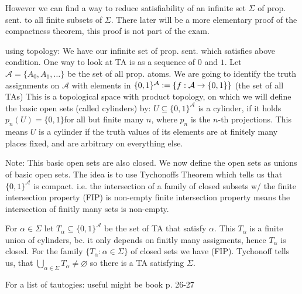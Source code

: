 However we can find a way to reduce satisfiability of an infinite set $\Sigma$ of prop. sent. to all finite subsets of $\Sigma$.
There later will be a more elementary proof of the compactness theorem, this proof is not part of the exam.
{
    using topology: We have our infinite set of prop. sent. which satisfies above condition. One way to look at TA is as a sequence of $0$ and $1$.
    Let $\mathcal{A} = \{A_0, A_1,\dots\}$ be the set of all prop. atoms. We are going to identify the truth assignments on $\mathcal{A}$
    with elements in $\{0,1\}^\mathcal{A}\vcentcolon= \{f: \mathcal{A}\to \{0,1\}\}$ (the set of all TAs)
    This is a topological space with product topology, on which we will define
    the basic open sets (called cylinders) by:
    $ U\subseteq \{0,1\}^\mathcal{A}$ is a cylinder, if it holds $p_n(U) = \{0,1\}$for all but finite many $n$, where $p_n$ is the $n$-th projections.
    This means $U$ is a cylinder if the truth values of its elements are at finitely many places fixed, and are arbitrary on everything else.
    
    
    Note: This basic open sets are also closed.
    We now define the open sets as unions of basic open sets.
    The idea is to use Tychonoffs Theorem which tells us that $\{0,1\}^\mathcal{A}$ is compact. i.e.
    the intersection of a family of closed subsets w/ the finite intersection property (FIP) is non-empty
    finite intersection property means the intersection of finitly many sets is non-empty.

    For $\alpha \in \Sigma$ let $T_\alpha \subseteq \{0,1\}^\mathcal{A}$ be the set of TA that satisfy $\alpha$.
    This $T_\alpha$ is a finite union of cylinders, bc. it only depends on finitly many assigments, hence $T_\alpha$ is closed.
    For the family $\{T_\alpha: \alpha\in\Sigma\}$ of closed sets we have (FIP). Tychonoff tells us, 
    that $\bigcup_{\alpha\in\Sigma}{T_\alpha}\neq \varnothing$ so there is a TA satisfying $\Sigma$.}
    
    For a list of tautogies: useful might be book p. 26-27
